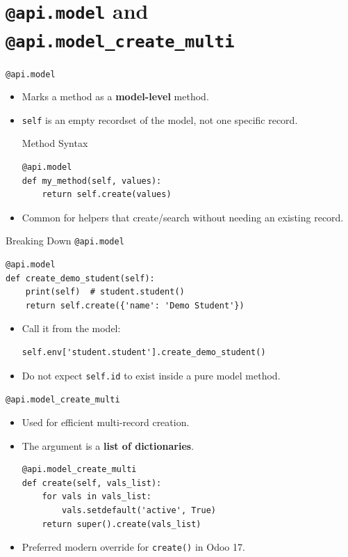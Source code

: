 \section{\texttt{@api.model} and \texttt{@api.model\_create\_multi}}

\begin{frame}[fragile]{\texttt{@api.model}}
	\begin{itemize}
		\item Marks a method as a \textbf{model-level} method.
		\item \texttt{self} is an empty recordset of the model, not one specific record.
\begin{block}{Method Syntax}
\begin{lstlisting}
@api.model
def my_method(self, values):
	return self.create(values)
\end{lstlisting}
\end{block}
		\item Common for helpers that create/search without needing an existing record.
	\end{itemize}
\end{frame}

\begin{frame}[fragile]{Breaking Down \texttt{@api.model}}
\begin{lstlisting}
@api.model
def create_demo_student(self):
	print(self)  # student.student()
	return self.create({'name': 'Demo Student'})
\end{lstlisting}
	\begin{itemize}
		\item Call it from the model:
\begin{lstlisting}
self.env['student.student'].create_demo_student()
\end{lstlisting}
		\item Do not expect \texttt{self.id} to exist inside a pure model method.
	\end{itemize}
\end{frame}

\begin{frame}[fragile]{\texttt{@api.model\_create\_multi}}
	\begin{itemize}
		\item Used for efficient multi-record creation.
		\item The argument is a \textbf{list of dictionaries}.
\begin{lstlisting}
@api.model_create_multi
def create(self, vals_list):
	for vals in vals_list:
		vals.setdefault('active', True)
	return super().create(vals_list)
\end{lstlisting}
		\item Preferred modern override for \texttt{create()} in Odoo 17.
	\end{itemize}
\end{frame}

